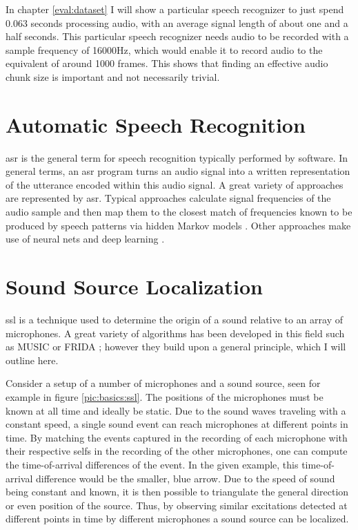 In chapter \ref{eval:dataset} I will show a particular speech recognizer to just spend 0.063 seconds processing audio, with an average signal length of about one and a half seconds.
This particular speech recognizer needs audio to be recorded with a sample frequency of 16000Hz, which would enable it to record audio to the equivalent
of around 1000 frames. %
This shows that finding an effective audio chunk size is important and not necessarily trivial.

\section{Automatic Speech Recognition}
\gls{asr} is the general term for speech recognition typically performed by software.
In general terms, an \gls{asr} program turns an audio signal into a written representation of the utterance encoded within this audio signal.
A great variety of approaches are represented by \gls{asr}.
Typical approaches calculate signal frequencies of the audio sample and then map them to the closest match of frequencies known to be produced by speech patterns via hidden Markov models \cite{266524,GALES199875}.
Other approaches make use of neural nets and deep learning \cite{6639344}.

\section{Sound Source Localization}
\label{basics:ssl}
\gls{ssl} \cite{ssl} is a technique used to determine the origin of a sound relative to an array of microphones.
A great variety of algorithms has been developed in this field such as MUSIC \cite{music} or FRIDA \cite{7952744}; however they build upon a general principle, which I will outline here.

Consider a setup of a number of microphones and a sound source, seen for example in figure \ref{pic:basics:ssl}.
The positions of the microphones must be known at all time and ideally be static.
Due to the sound waves traveling with a constant speed, a single sound event can reach microphones at different points in time.
By matching the events captured in the recording of each microphone with their respective selfs in the recording of the other microphones, one can compute the time-of-arrival differences of the event.
In the given example, this time-of-arrival difference would be the smaller, blue arrow.
Due to the speed of sound being constant and known, it is then possible to triangulate the general direction or even position of the source.
Thus, by observing similar excitations detected at different points in time by different microphones a sound source can be localized.

